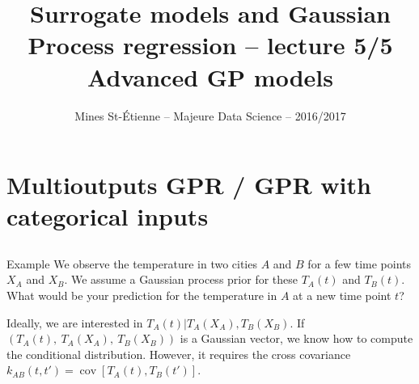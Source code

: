 \documentclass{beamer}
\title[Majeure Data Science -- Surrogate models and GPR]{\texorpdfstring{ \small Surrogate models and Gaussian Process regression -- lecture 5/5 \\ \vspace{3mm} \LARGE Advanced GP models}{}}
\author[Mines St-\'Etienne ]{Mines St-\'Etienne -- Majeure Data Science -- 2016/2017}
\institute{\texorpdfstring{Nicolas Durrande (durrande@emse.fr)}{}}
\date{\null}
\DeclareMathOperator*{\Cov}{cov}
\begin{document}

\begin{frame}
  \titlepage
\end{frame}

\section[Multioutputs GPR]{Multioutputs GPR / GPR with categorical inputs}
\subsection{}

\begin{frame}{}
\begin{exampleblock}{Example}
	We observe the temperature in two cities $A$ and $B$ for a few time points $X_A$ and $X_B$. We assume a Gaussian process prior for these $T_A(t)$ and $T_B(t)$. What would be your prediction for the temperature in $A$ at a new time point $t$?
\end{exampleblock}
\pause
Ideally, we are interested in $T_A(t)|T_A(X_A), T_B(X_B)$. If $(T_A(t),\ T_A(X_A),\ T_B(X_B))$ is a Gaussian vector, we know how to compute the conditional distribution. However, it requires the cross covariance $k_{AB}(t,t') = \Cov[T_A(t),T_B(t')]$.
\end{frame}
\end{document}
